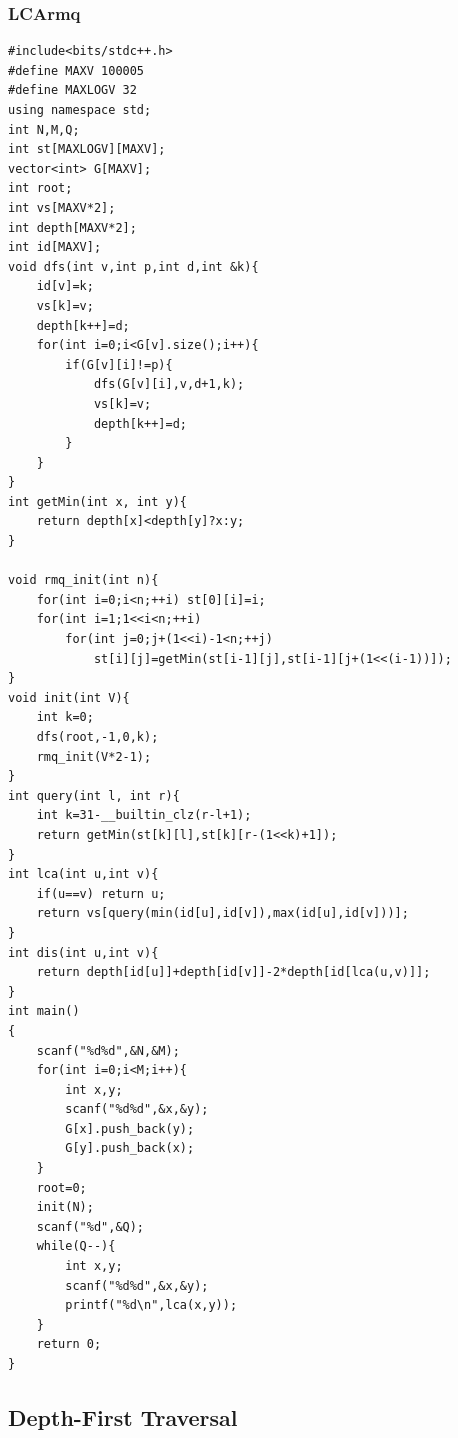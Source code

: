 \documentclass[twoside]{article}
\begin{document}
\subsubsection{LCArmq}
\begin{lstlisting}
#include<bits/stdc++.h>
#define MAXV 100005
#define MAXLOGV 32
using namespace std;
int N,M,Q;
int st[MAXLOGV][MAXV];
vector<int> G[MAXV];
int root;
int vs[MAXV*2];
int depth[MAXV*2];
int id[MAXV];
void dfs(int v,int p,int d,int &k){
    id[v]=k;
    vs[k]=v;
    depth[k++]=d;
    for(int i=0;i<G[v].size();i++){
        if(G[v][i]!=p){
            dfs(G[v][i],v,d+1,k);
            vs[k]=v;
            depth[k++]=d;
        }
    }
}
int getMin(int x, int y){
    return depth[x]<depth[y]?x:y;
}

void rmq_init(int n){
    for(int i=0;i<n;++i) st[0][i]=i;
    for(int i=1;1<<i<n;++i)
        for(int j=0;j+(1<<i)-1<n;++j)
            st[i][j]=getMin(st[i-1][j],st[i-1][j+(1<<(i-1))]);
}
void init(int V){
    int k=0;
    dfs(root,-1,0,k);
    rmq_init(V*2-1);
}
int query(int l, int r){
    int k=31-__builtin_clz(r-l+1);
    return getMin(st[k][l],st[k][r-(1<<k)+1]);
}
int lca(int u,int v){
    if(u==v) return u;
    return vs[query(min(id[u],id[v]),max(id[u],id[v]))];
}
int dis(int u,int v){
    return depth[id[u]]+depth[id[v]]-2*depth[id[lca(u,v)]];
}
int main()
{
    scanf("%d%d",&N,&M);
    for(int i=0;i<M;i++){
        int x,y;
        scanf("%d%d",&x,&y);
        G[x].push_back(y);
        G[y].push_back(x);
    }
    root=0;
    init(N);
    scanf("%d",&Q);
    while(Q--){
        int x,y;
        scanf("%d%d",&x,&y);
        printf("%d\n",lca(x,y));
    }
    return 0;
}
\end{lstlisting}
\subsection{Depth-First Traversal}
\end{document}
